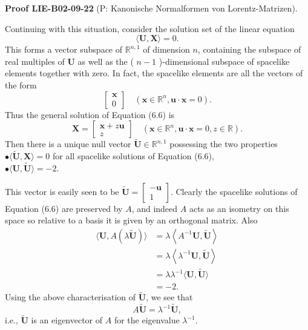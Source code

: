 \documentclass[10pt, letterpaper]{article}
\newcommand{\CustomHeading}[3]{%
  \par\medskip\noindent%
  \textbf{#1 #2} \textnormal{(#3)}.\enskip%
}
\newenvironment{PROOF}[2]{\begin{unitbox}\CustomHeading{Proof}{#1}{#2}}{\end{unitbox}}
\begin{document}
\begin{PROOF}{LIE-B02-09-22}{P: Kanonische Normalformen von Lorentz-Matrizen}
Continuing with this situation, consider the solution set of the linear equation
$$
\langle\mathbf{U}, \mathbf{X}\rangle=0 .
$$
This forms a vector subspace of $\mathbb{R}^{n, 1}$ of dimension $n$, containing the subspace of real multiples of $\mathbf{U}$ as well as the ( $n-1$ )-dimensional subspace of spacelike elements together with zero. In fact, the spacelike elements are all the vectors of the form
$$
\left[\begin{array}{l}
\mathbf{x} \\
0
\end{array}\right] \quad\left(\mathbf{x} \in \mathbb{R}^{n}, \mathbf{u} \cdot \mathbf{x}=0\right) .
$$
Thus the general solution of Equation (6.6) is
$$
\mathbf{X}=\left[\begin{array}{c}
\mathbf{x}+z \mathbf{u} \\
z
\end{array}\right] \quad\left(\mathbf{x} \in \mathbb{R}^{n}, \mathbf{u} \cdot \mathbf{x}=0, z \in \mathbb{R}\right) .
$$
Then there is a unique null vector $\widetilde{\mathbf{U}} \in \mathbb{R}^{n, 1}$ possessing the two properties\\
$\bullet\langle\tilde{\mathbf{U}}, \mathbf{X}\rangle=0$ for all spacelike solutions of Equation (6.6),\\
$\bullet\langle\mathbf{U}, \tilde{\mathbf{U}}\rangle=-2$.


This vector is easily seen to be $\tilde{\mathbf{U}}=\left[\begin{array}{c}-\mathbf{u} \\ 1\end{array}\right]$. Clearly the spacelike solutions of Equation (6.6) are preserved by $A$, and indeed $A$ acts as an isometry on this space so relative to a basis it is given by an orthogonal matrix. Also
$$
\begin{aligned}
\langle\mathbf{U}, A(\lambda \tilde{\mathbf{U}})\rangle & =\lambda\left\langle A^{-1} \mathbf{U}, \tilde{\mathbf{U}}\right\rangle \\
& =\lambda\left\langle\lambda^{-1} \mathbf{U}, \tilde{\mathbf{U}}\right\rangle \\
& =\lambda \lambda^{-1}\langle\mathbf{U}, \tilde{\mathbf{U}}\rangle \\
& =-2 .
\end{aligned}
$$
Using the above characterisation of $\tilde{\mathbf{U}}$, we see that
$$
A \tilde{\mathbf{U}}=\lambda^{-1} \tilde{\mathbf{U}},
$$
i.e., $\tilde{\mathbf{U}}$ is an eigenvector of $A$ for the eigenvalue $\lambda^{-1}$.



\end{PROOF}
\end{document}
